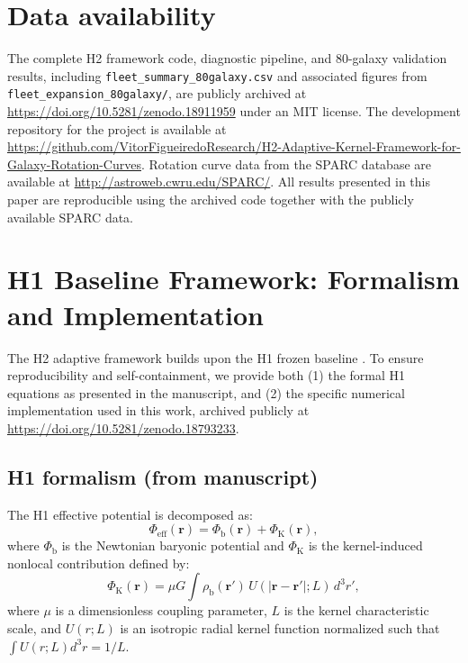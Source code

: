 \documentclass{aa}
\begin{document}

\section*{Data availability}

The complete H2 framework code, diagnostic pipeline, and 80-galaxy
validation results, including \texttt{fleet\_summary\_80galaxy.csv} and
associated figures from \texttt{fleet\_expansion\_80galaxy/}, are publicly
archived at \url{https://doi.org/10.5281/zenodo.18911959} under an MIT
license. The development repository for the project is available at
\url{https://github.com/VitorFigueiredoResearch/H2-Adaptive-Kernel-Framework-for-Galaxy-Rotation-Curves}.
Rotation curve data from the SPARC database \citep{lelli2016} are
available at \url{http://astroweb.cwru.edu/SPARC/}. All results presented
in this paper are reproducible using the archived code together with the
publicly available SPARC data.

\appendix
\section{H1 Baseline Framework: Formalism and Implementation}
\label{app:h1}

The H2 adaptive framework builds upon the H1 frozen baseline \citep{figueiredo2024_h1, figueiredo2024_h1p5}. To ensure reproducibility and self-containment, we provide both (1) the formal H1 equations as presented in the manuscript, and (2) the specific numerical implementation used in this work, archived publicly at \href{https://doi.org/10.5281/zenodo.18793233}{https://doi.org/10.5281/zenodo.18793233}.

\subsection{H1 formalism (from manuscript)}

The H1 effective potential is decomposed as:
\begin{equation}
	\Phi_{\mathrm{eff}}(\mathbf{r}) = \Phi_{\mathrm{b}}(\mathbf{r}) + \Phi_{\mathrm{K}}(\mathbf{r}),
	\label{eq:phi_eff}
\end{equation}
where $\Phi_{\mathrm{b}}$ is the Newtonian baryonic potential and $\Phi_{\mathrm{K}}$ is the kernel-induced nonlocal contribution defined by:
\begin{equation}
	\Phi_{\mathrm{K}}(\mathbf{r}) = \mu G \int \rho_{\mathrm{b}}(\mathbf{r}') \, U(|\mathbf{r} - \mathbf{r}'|; L) \, d^3r',
	\label{eq:convolution}
\end{equation}
where $\mu$ is a dimensionless coupling parameter, $L$ is the kernel characteristic scale, and $U(r;L)$ is an isotropic radial kernel function normalized such that $\int U(r;L) d^3r = 1/L$.
\end{document}
